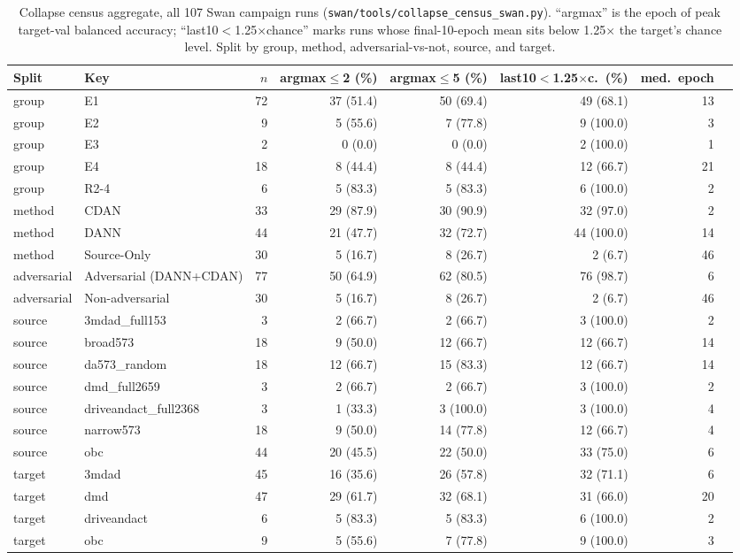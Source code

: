 \begin{table}[t]
\centering
\caption{Collapse census aggregate, all 107 Swan campaign runs (\texttt{swan/tools/collapse\_census\_swan.py}). ``argmax'' is the epoch of peak target-val balanced accuracy; ``last10$<$1.25$\times$chance'' marks runs whose final-10-epoch mean sits below 1.25$\times$ the target's chance level. Split by group, method, adversarial-vs-not, source, and target.}
\label{tab:collapse_census}
\footnotesize
\setlength{\tabcolsep}{3pt}
\begin{tabular}{llrrrrrl}
\toprule
Split & Key & $n$ & argmax$\leq$2 (\%) & argmax$\leq$5 (\%) & last10$<$1.25$\times$c.\ (\%) & med.\ epoch \\
\midrule
group & E1 & 72 & 37 (51.4) & 50 (69.4) & 49 (68.1) & 13 \\
group & E2 & 9 & 5 (55.6) & 7 (77.8) & 9 (100.0) & 3 \\
group & E3 & 2 & 0 (0.0) & 0 (0.0) & 2 (100.0) & 1 \\
group & E4 & 18 & 8 (44.4) & 8 (44.4) & 12 (66.7) & 21 \\
group & R2-4 & 6 & 5 (83.3) & 5 (83.3) & 6 (100.0) & 2 \\
\midrule
method & CDAN & 33 & 29 (87.9) & 30 (90.9) & 32 (97.0) & 2 \\
method & DANN & 44 & 21 (47.7) & 32 (72.7) & 44 (100.0) & 14 \\
method & Source-Only & 30 & 5 (16.7) & 8 (26.7) & 2 (6.7) & 46 \\
\midrule
adversarial & Adversarial (DANN+CDAN) & 77 & 50 (64.9) & 62 (80.5) & 76 (98.7) & 6 \\
adversarial & Non-adversarial & 30 & 5 (16.7) & 8 (26.7) & 2 (6.7) & 46 \\
\midrule
source & 3mdad\_full153 & 3 & 2 (66.7) & 2 (66.7) & 3 (100.0) & 2 \\
source & broad573 & 18 & 9 (50.0) & 12 (66.7) & 12 (66.7) & 14 \\
source & da573\_random & 18 & 12 (66.7) & 15 (83.3) & 12 (66.7) & 14 \\
source & dmd\_full2659 & 3 & 2 (66.7) & 2 (66.7) & 3 (100.0) & 2 \\
source & driveandact\_full2368 & 3 & 1 (33.3) & 3 (100.0) & 3 (100.0) & 4 \\
source & narrow573 & 18 & 9 (50.0) & 14 (77.8) & 12 (66.7) & 4 \\
source & obc & 44 & 20 (45.5) & 22 (50.0) & 33 (75.0) & 6 \\
\midrule
target & 3mdad & 45 & 16 (35.6) & 26 (57.8) & 32 (71.1) & 6 \\
target & dmd & 47 & 29 (61.7) & 32 (68.1) & 31 (66.0) & 20 \\
target & driveandact & 6 & 5 (83.3) & 5 (83.3) & 6 (100.0) & 2 \\
target & obc & 9 & 5 (55.6) & 7 (77.8) & 9 (100.0) & 3 \\
\bottomrule
\end{tabular}
\end{table}
